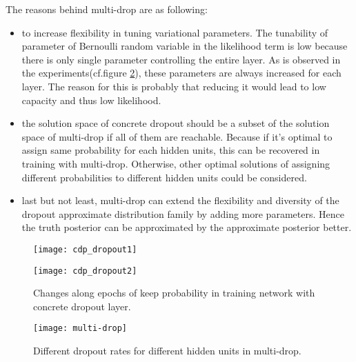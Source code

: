 The reasons behind multi-drop are as following:
\begin{itemize}
\item to increase flexibility in tuning variational parameters. The tunability of parameter of Bernoulli random variable in the likelihood term is low because there is only single parameter controlling the entire layer. As is observed in the experiments(cf.figure \ref{fig:cdp_dropout2}), these parameters are always increased for each layer. The reason for this is probably that reducing it would lead to low capacity and thus low likelihood. 

\item the solution space of concrete dropout should be a subset of the solution space of multi-drop if all of them are reachable. Because if it's optimal to assign same probability for each hidden units, this can be recovered in training with multi-drop. Otherwise, other optimal solutions of assigning different probabilities to different hidden units could be considered.

\item last but not least, multi-drop can extend the flexibility and diversity of the dropout approximate distribution family by adding more parameters. Hence the truth posterior can be approximated by the approximate posterior better.
 
\end{itemize}

\begin{figure}[h!]
	\begin{center}
		\texttt{[image: cdp\_dropout1]}	
		\label{fig:cdp_dropout1}
	\end{center}
\end{figure}

\begin{figure}[h!]
	\begin{center}
		\texttt{[image: cdp\_dropout2]}	
		\label{fig:cdp_dropout2}
		\caption{Changes along epochs of keep probability in training network with concrete dropout layer.}
	\end{center}
\end{figure}

\begin{figure}[H]
	\begin{center}
		\centering
		\texttt{[image: multi-drop]}
		\caption{Different dropout rates for different hidden units in multi-drop.}		
		\label{fig:multi-drop}
	\end{center}
\end{figure}

